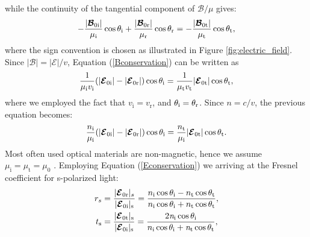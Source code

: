 while the continuity of the tangential component of $\boldsymbol{\mathcal{B}}/\mu$ gives:
\begin{equation}\label{Bconservation}
-\frac{|\boldsymbol{\mathcal{B}}_{0\textrm{i}}|}{\mu_\textrm{i}}\cos\theta_{\textrm{i}}+\frac{|\boldsymbol{\mathcal{B}}_{0\textrm{r}}|}{\mu_\textrm{r}}\cos\theta_{\textrm{r}} = 
-\frac{|\boldsymbol{\mathcal{B}}_{0\textrm{t}}|}{\mu_\textrm{t}}\cos\theta_{\textrm{t}},
\end{equation}
where the sign convention is chosen as illustrated in Figure \ref{fig:electric_field}.
Since $|\boldsymbol{\mathcal{B}}| = |\boldsymbol{\mathcal{E}}|/v$, Equation (\ref{Bconservation}) can be written as 
\begin{equation}
\frac{1}{\mu_{\textrm{i}}v_{\textrm{i}}}(|\boldsymbol{\mathcal{E}}_{0\textrm{i}}|-|\boldsymbol{\mathcal{E}}_{0\textrm{r}}|)\cos\theta_{\textrm{i}} = \frac{1}{\mu_{\textrm{t}}v_{\textrm{t}}}|\boldsymbol{\mathcal{E}}_{0\textrm{t}}|\cos\theta_{\textrm{t}},
\end{equation}
where we employed the fact that $v_{\textrm{i}}= v_{\textrm{r}}$, and $\theta_{\textrm{i}}= \theta_{\textrm{r}}$. 
Since $n = c/v$, the previous equation becomes:
\begin{equation}
\frac{n_{\textrm{i}}}{\mu_{\textrm{i}}}(|\boldsymbol{\mathcal{E}}_{0\textrm{i}}|-|\boldsymbol{\mathcal{E}}_{0\textrm{r}}|)\cos\theta_{\textrm{i}} = \frac{n_{\textrm{t}}}{\mu_{\textrm{i}}}|\boldsymbol{\mathcal{E}}_{0\textrm{t}}|\cos\theta_{\textrm{t}}.
\end{equation}
Most often used optical materials are non-magnetic, hence we assume $\mu_{\textrm{i}}=\mu_{\textrm{t}}=\mu_{0}$ \cite{lvovsky2013fresnel}. Employing Equation (\ref{Econservation}) we arriving at the Fresnel coefficient for s-polarized light:
\begin{equation} \label{Fresnel_perpendicular}
\begin{split}
r_{s} & =\frac{|\boldsymbol{\mathcal{E}}_{0 \textrm{r}}|_{s}}{|\boldsymbol{\mathcal{E}}_{0\textrm{i}}|_\textrm{s}} = 
\frac{n_\textrm{i}\cos\theta_\textrm{i}-n_\textrm{t} \cos\theta_\textrm{t}}{n_\textrm{i}
\cos\theta_\textrm{i}+n_\textrm{t}\cos\theta_\textrm{t}},\\
t_{\textrm{s}} & = \frac{|\boldsymbol{\mathcal{E}}_{0 \textrm{t}}|_\textrm{s}}{|\boldsymbol{\mathcal{E}}_{0\textrm{i}}|_\textrm{s}} 
=\frac{2\textit{n}_\textrm{i}\cos\theta_\textrm{i}}{n_\textrm{i}\cos\theta_\textrm{i}+\textit{n}_\textrm{t}\cos\theta_\textrm{t}},\\
\end{split}
\end{equation}
